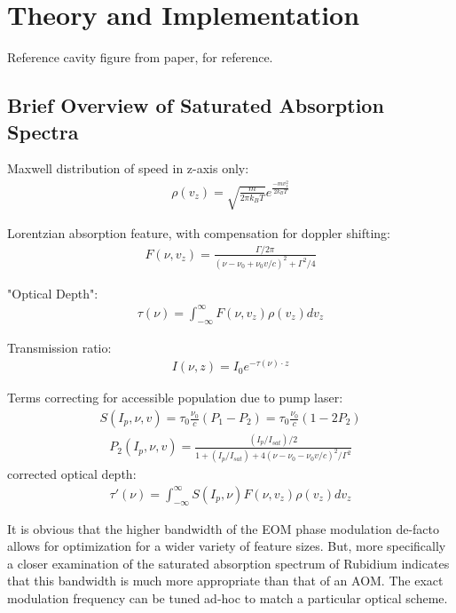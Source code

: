 \newpage
\section{Theory and Implementation} \label{sec:theory}

Reference cavity figure from paper, for reference.

\subsection{Brief Overview of Saturated Absorption Spectra}

Maxwell distribution of speed in z-axis only:
\begin{gather}
  \rho(v_z) = \sqrt{\frac{m}{2\pi k_B T}} e^{\frac{-m v_z^2}{2k_B T}}
\end{gather}

Lorentzian absorption feature, with compensation for doppler shifting:
\begin{gather}
  F(\nu, v_z) = \frac{\Gamma / 2 \pi}{(\nu - \nu_0 + \nu_0 v / c)^2 +
  \Gamma^2 / 4}
\end{gather}

"Optical Depth":
\begin{gather}
  \tau(\nu) = \int_{-\infty}^\infty F(\nu, v_z) \rho(v_z) dv_z
\end{gather}

Transmission ratio:
\begin{gather}
  I(\nu, z) = I_0 e^{-\tau(\nu)\cdot z}
\end{gather}

Terms correcting for accessible population due to pump laser:
\begin{gather}
  S(I_p, \nu, v) = \tau_0 \frac{\nu_0}{c} (P_1 - P_2) =
    \tau_0 \frac{\nu_0}{c} (1 - 2 P_2)
\end{gather}
\begin{gather}
  P_2(I_p, \nu, v) = \frac{ (I_p/I_{sat})/2}{1 + (I_p/I_{sat}) +
    4(\nu - \nu_0 - \nu_0 v/c)^2/\Gamma^2}
\end{gather}
corrected optical depth:
\begin{gather}\label{eq:corr_opt_depth}
  \tau'(\nu) = \int_{-\infty}^\infty S(I_p, \nu) F(\nu, v_z) \rho(v_z) dv_z
\end{gather}

It is obvious that the higher bandwidth of the EOM phase modulation de-facto
allows for optimization for a wider variety of feature sizes. But, more
specifically a closer examination of the saturated absorption spectrum of
Rubidium indicates that this bandwidth is much more appropriate than that of an
AOM. The exact modulation frequency can be tuned ad-hoc to match a particular
optical scheme.

